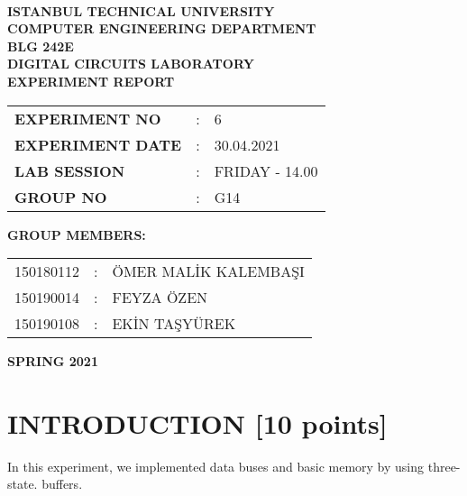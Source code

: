 \documentclass[pdftex,12pt,a4paper]{article}
\begin{document}
\begin{titlepage}
\begin{center}
\textbf{}\\
\textbf{\Large{ISTANBUL TECHNICAL UNIVERSITY}}\\
\vspace{0.5cm}
\textbf{\Large{COMPUTER ENGINEERING DEPARTMENT}}\\
\vspace{2cm}
\textbf{\Large{BLG 242E\\ DIGITAL CIRCUITS LABORATORY\\ EXPERIMENT REPORT}}\\
\vspace{2.8cm}
\begin{table}[ht]
\centering
\Large{
\begin{tabular}{lcl}
\textbf{EXPERIMENT NO}  & : & 6 \\
\textbf{EXPERIMENT DATE}  & : & 30.04.2021 \\
\textbf{LAB SESSION}  & : & FRIDAY - 14.00 \\
\textbf{GROUP NO}  & : & G14 \\
\end{tabular}}
\end{table}
\vspace{1cm}
\textbf{\Large{GROUP MEMBERS:}}\\
\begin{table}[ht]
\centering
\Large{
\begin{tabular}{rcl}
150180112  & : & ÖMER MALİK KALEMBAŞI \\
150190014  & : & FEYZA ÖZEN \\
150190108  & : & EKİN TAŞYÜREK \\
\end{tabular}}
\end{table}
\vspace{2.8cm}
\textbf{\Large{SPRING 2021}}

\end{center}

\end{titlepage}

\thispagestyle{empty}
\setcounter{tocdepth}{4}
\tableofcontents
\clearpage

\setcounter{page}{1}

\section{INTRODUCTION [10 points]}
In this experiment, we implemented data buses and basic memory by using three-state. buffers.
\end{document}
